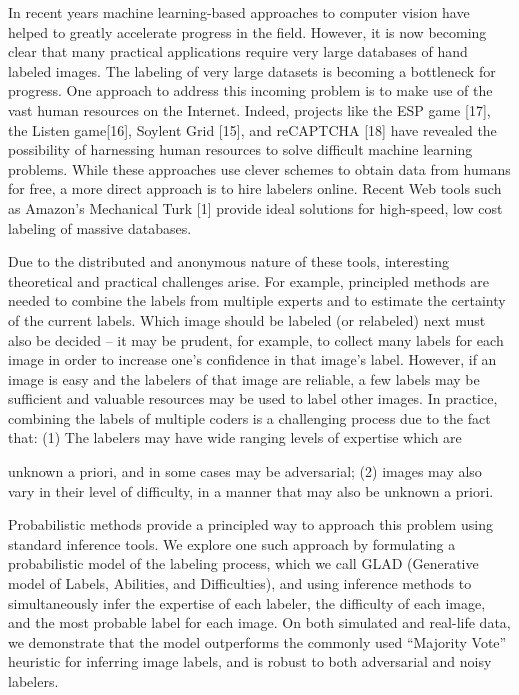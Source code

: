 \documentclass[
]{article}
\begin{document}
In recent years machine learning-based approaches to computer vision
have helped to greatly accelerate progress in the field. However, it is
now becoming clear that many practical applications require very large
databases of hand labeled images. The labeling of very large datasets is
becoming a bottleneck for progress. One approach to address this
incoming problem is to make use of the vast human resources on the
Internet. Indeed, projects like the ESP game {[}17{]}, the Listen
game{[}16{]}, Soylent Grid {[}15{]}, and reCAPTCHA {[}18{]} have
revealed the possibility of harnessing human resources to solve
difficult machine learning problems. While these approaches use clever
schemes to obtain data from humans for free, a more direct approach is
to hire labelers online. Recent Web tools such as Amazon's Mechanical
Turk {[}1{]} provide ideal solutions for high-speed, low cost labeling
of massive databases.

Due to the distributed and anonymous nature of these tools, interesting
theoretical and practical challenges arise. For example, principled
methods are needed to combine the labels from multiple experts and to
estimate the certainty of the current labels. Which image should be
labeled (or relabeled) next must also be decided -- it may be prudent,
for example, to collect many labels for each image in order to increase
one's confidence in that image's label. However, if an image is easy and
the labelers of that image are reliable, a few labels may be sufficient
and valuable resources may be used to label other images. In practice,
combining the labels of multiple coders is a challenging process due to
the fact that: (1) The labelers may have wide ranging levels of
expertise which are

unknown a priori, and in some cases may be adversarial; (2) images may
also vary in their level of difficulty, in a manner that may also be
unknown a priori.

Probabilistic methods provide a principled way to approach this problem
using standard inference tools. We explore one such approach by
formulating a probabilistic model of the labeling process, which we call
GLAD (Generative model of Labels, Abilities, and Difficulties), and
using inference methods to simultaneously infer the expertise of each
labeler, the difficulty of each image, and the most probable label for
each image. On both simulated and real-life data, we demonstrate that
the model outperforms the commonly used ``Majority Vote'' heuristic for
inferring image labels, and is robust to both adversarial and noisy
labelers.
\end{document}
